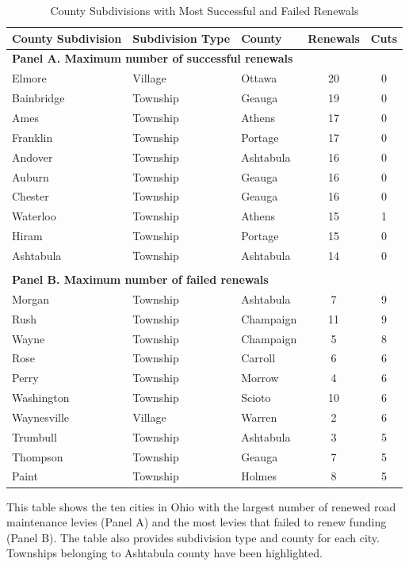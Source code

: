 \begin{table}[ht]
    \centering
    \caption{County Subdivisions with Most Successful and Failed Renewals}
    \label{tab:max_renewals_cuts}
    \begin{tabular}{p{4cm}p{3cm}p{3cm}cc}
        \hline
        County Subdivision & Subdivision Type & County & Renewals & Cuts \\
        \hline
        \multicolumn{5}{l}{\textbf{Panel A. Maximum number of successful renewals}} \\
        Elmore & Village & Ottawa & 20 & 0 \\
        Bainbridge & Township & Geauga & 19 & 0 \\
        Ames & Township & Athens & 17 & 0 \\
        Franklin & Township & Portage & 17 & 0 \\
        Andover & Township & Ashtabula & 16 & 0 \\
        Auburn & Township & Geauga & 16 & 0 \\
        Chester & Township & Geauga & 16 & 0 \\
        Waterloo & Township & Athens & 15 & 1 \\
        Hiram & Township & Portage & 15 & 0 \\
        Ashtabula & Township & Ashtabula & 14 & 0 \\
        \\
        \multicolumn{5}{l}{\textbf{Panel B. Maximum number of failed renewals}} \\
        Morgan & Township & Ashtabula & 7 & 9 \\
        Rush & Township & Champaign & 11 & 9 \\
        Wayne & Township & Champaign & 5 & 8 \\
        Rose & Township & Carroll & 6 & 6 \\
        Perry & Township & Morrow & 4 & 6 \\
        Washington & Township & Scioto & 10 & 6 \\
        Waynesville & Village & Warren & 2 & 6 \\
        Trumbull & Township & Ashtabula & 3 & 5 \\
        Thompson & Township & Geauga & 7 & 5 \\
        Paint & Township & Holmes & 8 & 5 \\
        \hline
    \end{tabular}
    \begin{tablenotes}
        \small
        \item This table shows the ten cities in Ohio with the largest number of renewed road maintenance levies (Panel A) and the most levies that failed to renew funding (Panel B). The table also provides subdivision type and county for each city. Townships belonging to Ashtabula county have been highlighted.  
    \end{tablenotes}
\end{table}

